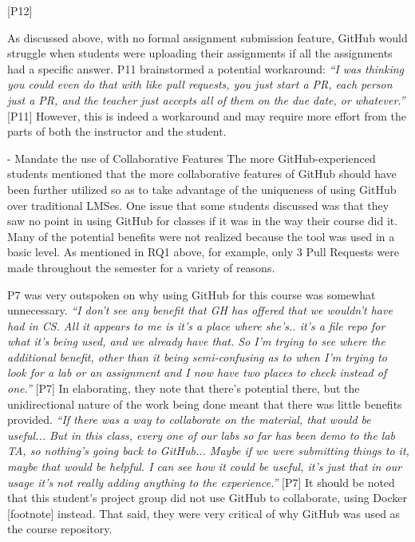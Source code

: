  [P12]

As discussed above, with no formal assignment submission feature, GitHub would struggle when students were uploading their assignments if all the assignments had a specific answer. P11 brainstormed a potential workaround: \textit{``I was thinking you could even do that with like pull requests, you just start a PR, each person just a PR, and the teacher just accepts all of them on the due date, or whatever.''} [P11] However, this is indeed a workaround and may require more effort from the parts of both the instructor and the student.

- Mandate the use of Collaborative Features
The more GitHub-experienced students mentioned that the more collaborative features of GitHub should have been further utilized so as to take advantage of the uniqueness of using GitHub over traditional LMSes. One issue that some students discussed was that they saw no point in using GitHub for classes if it was in the way their course did it. Many of the potential benefits were not realized because the tool was used in a basic level. As mentioned in RQ1 above, for example, only 3 Pull Requests were made throughout the semester for a variety of reasons.

P7 was very outspoken on why using GitHub for this course was somewhat unnecessary. \textit{``I don't see any benefit that GH has offered that we wouldn't have had in CS. All it appears to me is it's a place where she's.. it's a file repo for what it's being used, and we already have that. So I'm trying to see where the additional benefit, other than it being semi-confusing as to when I'm trying to look for a lab or an assignment and I now have two places to check instead of one.''} [P7] In elaborating, they note that there's potential there, but the unidirectional nature of the work being done meant that there was little benefits provided. \textit{``If there was a way to collaborate on the material, that would be useful... But in this class, every one of our labs so far has been demo to the lab TA, so nothing's going back to GitHub... Maybe if we were submitting things to it, maybe that would be helpful. I can see how it could be useful, it's just that in our usage it's not really adding anything to the experience.''} [P7] It should be noted that this student's project group did not use GitHub to collaborate, using Docker [footnote] instead. That said, they were very critical of why GitHub was used as the course repository.


